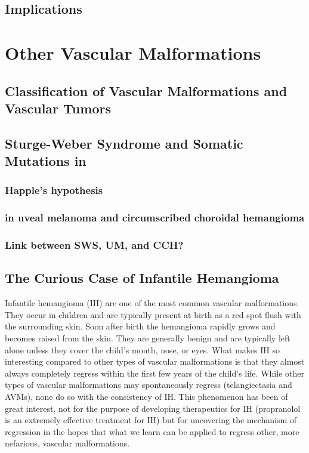 \subsection{Implications}

\section{Other Vascular Malformations}
\subsection{Classification of Vascular Malformations and Vascular Tumors}

\subsection{Sturge-Weber Syndrome and Somatic Mutations in }
\subsubsection{Happle's hypothesis}
\subsubsection{ in uveal melanoma and circumscribed choroidal hemangioma}
\subsubsection{Link between SWS, UM, and CCH?}

\subsection{The Curious Case of Infantile Hemangioma}
Infantile hemangioma (IH) are one of the most common vascular malformations. They occur in children and are typically present at birth as a red spot flush with the surrounding skin. Soon after birth the hemangioma rapidly grows and becomes raised from the skin. They are generally benign and are typically left alone unless they cover the child's mouth, nose, or eyes. What makes IH so interesting compared to other types of vascular malformations is that they almost always completely regress within the first few years of the child's life. While other types of vascular malformations may spontaneously regress (telangiectasia and AVMs), none do so with the consistency of IH. This phenomenon has been of great interest, not for the purpose of developing therapeutics for IH (propranolol is an extremely effective treatment for IH) but for uncovering the mechanism of regression in the hopes that what we learn can be applied to regress other, more nefarious, vascular malformations. 
